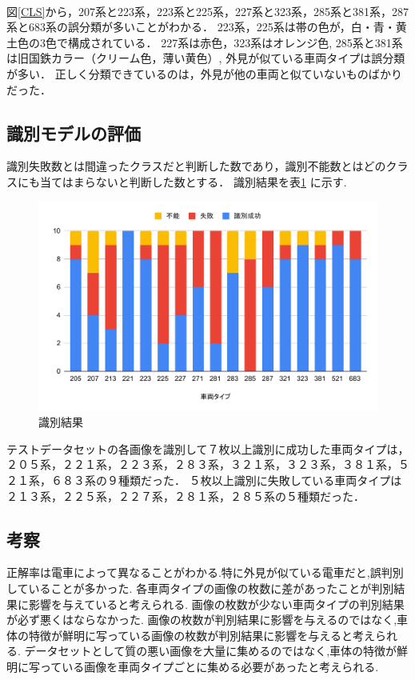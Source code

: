 \\
図\ref{CLS}から，207系と223系，223系と225系，227系と323系，285系と381系，287系と683系の誤分類が多いことがわかる．
223系，225系は帯の色が，白・青・黄土色の3色で構成されている．
227系は赤色，323系はオレンジ色,
285系と381系は旧国鉄カラー（クリーム色，薄い黄色）,
外見が似ている車両タイプは誤分類が多い．
正しく分類できているのは，外見が他の車両と似ていないものばかりだった．



\subsection{識別モデルの評価}
識別失敗数とは間違ったクラスだと判断した数であり，識別不能数とはどのクラスにも当てはまらないと判断した数とする．
識別結果を表\ref{fig:chartdet} に示す.\\
\begin{figure}[H]
	\centering
	\includegraphics[width=0.7\linewidth]{chap4/fig/chartDET}
	\caption[識別結果]{識別結果}
	\label{fig:chartdet}
\end{figure}


テストデータセットの各画像を識別して７枚以上識別に成功した車両タイプは，２０５系，２２１系，２２３系，２８３系，３２１系，３２３系，３８１系，５２１系，６８３系の９種類だった．
５枚以上識別に失敗している車両タイプは２１３系，２２５系，２２７系，２８１系，２８５系の５種類だった．

\subsection{考察}
正解率は電車によって異なることがわかる.特に外見が似ている電車だと,誤判別していることが多かった.
各車両タイプの画像の枚数に差があったことが判別結果に影響を与えていると考えられる.
画像の枚数が少ない車両タイプの判別結果が必ず悪くはならなかった.
画像の枚数が判別結果に影響を与えるのではなく,車体の特徴が鮮明に写っている画像の枚数が判別結果に影響を与えると考えられる.
データセットとして質の悪い画像を大量に集めるのではなく,車体の特徴が鮮明に写っている画像を車両タイプごとに集める必要があったと考えられる.


